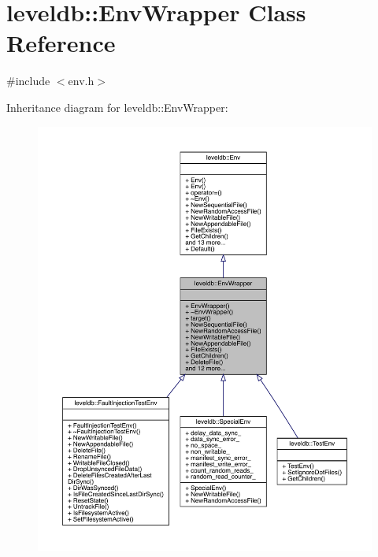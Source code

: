 \hypertarget{classleveldb_1_1_env_wrapper}{}\section{leveldb\+::Env\+Wrapper Class Reference}
\label{classleveldb_1_1_env_wrapper}


{\ttfamily \#include $<$env.\+h$>$}



Inheritance diagram for leveldb\+::Env\+Wrapper\+:
\nopagebreak
\begin{figure}[H]
\begin{center}
\leavevmode
\includegraphics[width=350pt]{classleveldb_1_1_env_wrapper__inherit__graph}
\end{center}
\end{figure}


